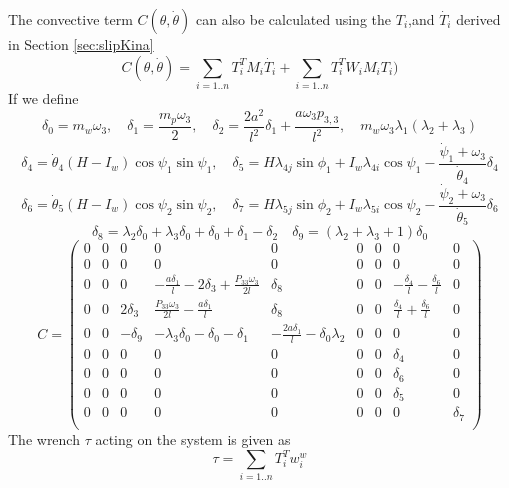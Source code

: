 {The convective term $C(\theta,\dot{\theta})$ can also be calculated using the $T_i$,and $\dot{T_i}$ derived in Section \ref{sec:slipKina}
\begin{equation}
C(\theta,\dot{\theta})=\sum_{i=1..n}T_i^T M_i\dot{T_i}+ \sum_{i=1..n}T_i^T W_i M_i T_i)\end{equation}
If we define
\[ \delta_0=m_w\omega_3, \quad \delta_1= \frac{m_p \omega_3}{2}, \quad \delta_2=\frac{2a^2}{l^2}\delta_1+\frac{a \omega_3 p_{3,3}}{l^2}, \quad m_w\omega_3 \lambda_1(\lambda_2+\lambda_3)\]
\[ \delta_4 = \dot\theta_4 (H-I_w)\cos{\psi_1}\sin{\psi_1},\quad \delta_5=H\lambda_{4j}\sin{\phi_1}+I_w \lambda_{4i}\cos{\psi_1}-\frac{\dot \psi_1+\omega_3}{\dot\theta_4}\delta_4  \]
\[ \delta_6 = \dot\theta_5 (H-I_w)\cos{\psi_2}\sin{\psi_2},\quad \delta_7=H\lambda_{5j}\sin{\phi_2}+I_w \lambda_{5i}\cos{\psi_2}-\frac{\dot \psi_2+\omega_3}{\dot\theta_5}\delta_6  \]
\[\delta_8=\lambda _2 \delta _0+\lambda _3 \delta _0+\delta _0+\delta _1-\delta _2 \quad \delta_9=(\lambda _2+\lambda _3 +1)\delta _0  \]
\[ C=
\left(
\begin{array}{ccccccccc}
 0 & 0 & 0 & 0 & 0 & 0 & 0 & 0 & 0 \\
 0 & 0 & 0 & 0 & 0 & 0 & 0 & 0 & 0 \\
 0 & 0 & 0 & -\frac{a \delta _1}{l}-2 \delta _3+\frac{P_{33} \omega _3}{2 l} & \delta_8 & 0 & 0 & -\frac{\delta _4}{l}-\frac{\delta _6}{l} & 0 \\
 0 & 0 & 2 \delta _3 & \frac{P_{33} \omega _3}{2 l}-\frac{a \delta _1}{l} & \delta_8 & 0 & 0 & \frac{\delta _4}{l}+\frac{\delta _6}{l} & 0 \\
 0 & 0 & -\delta_9& -\lambda _3 \delta _0-\delta _0-\delta _1 & -\frac{2 a \delta _1}{l}-\delta _0 \lambda _2 & 0 & 0 & 0 & 0 \\
 0 & 0 & 0 & 0 & 0 & 0 & 0 & \delta _4 & 0 \\
 0 & 0 & 0 & 0 & 0 & 0 & 0 & \delta _6 & 0 \\
 0 & 0 & 0 & 0 & 0 & 0 & 0 & \delta _5 & 0 \\
 0 & 0 & 0 & 0 & 0 & 0 & 0 & 0 & \delta _7 \\
\end{array}
\right)\]
The wrench $\tau$ acting on the system is given as 
\begin{equation}
\label{eqn:slipTauSum}
\tau=\sum_{i=1..n}T_i^T w^w_i
\end{equation}
\begin{figure}
	\begin{minipage}[t]{0.5\textwidth}
		\centering

\end{minipage}
\end{figure}}

